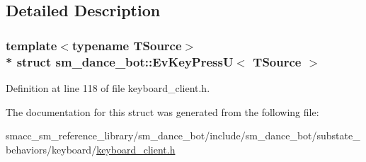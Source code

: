 \subsection{Detailed Description}
\subsubsection*{template$<$typename T\+Source$>$\\*
struct sm\+\_\+dance\+\_\+bot\+::\+Ev\+Key\+Press\+U$<$ T\+Source $>$}



Definition at line 118 of file keyboard\+\_\+client.\+h.



The documentation for this struct was generated from the following file\+:\begin{DoxyCompactItemize}
\item 
smacc\+\_\+sm\+\_\+reference\+\_\+library/sm\+\_\+dance\+\_\+bot/include/sm\+\_\+dance\+\_\+bot/substate\+\_\+behaviors/keyboard/\hyperlink{keyboard__client_8h}{keyboard\+\_\+client.\+h}\end{DoxyCompactItemize}
